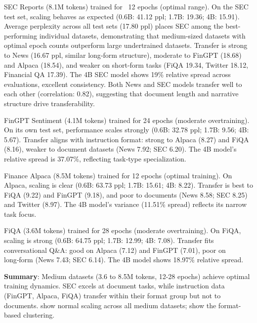 SEC Reports (8.1M tokens) trained for ~12 epochs (optimal range). On the SEC test set, scaling behaves as expected (0.6B: 41.12 ppl; 1.7B: 19.36; 4B: 15.91). Average perplexity across all test sets (17.80 ppl) places SEC among the best-performing individual datasets, demonstrating that medium-sized datasets with optimal epoch counts outperform large undertrained datasets. Transfer is strong to News (16.67 ppl, similar long‑form structure), moderate to FinGPT (18.68) and Alpaca (18.54), and weaker on short‑form tasks (FiQA 19.34, Twitter 18.12, Financial QA 17.39). The 4B SEC model shows 19\% relative spread across evaluations, excellent consistency. Both News and SEC models transfer well to each other (correlation: 0.82), suggesting that document length and narrative structure drive transferability.

FinGPT Sentiment (4.1M tokens) trained for 24 epochs (moderate overtraining). On its own test set, performance scales strongly (0.6B: 32.78 ppl; 1.7B: 9.56; 4B: 5.67). Transfer aligns with instruction format: strong to Alpaca (8.27) and FiQA (8.16), weaker to document datasets (News 7.92; SEC 6.20). The 4B model's relative spread is 37.07\%, reflecting task‑type specialization.

Finance Alpaca (8.5M tokens) trained for 12 epochs (optimal training). On Alpaca, scaling is clear (0.6B: 63.73 ppl; 1.7B: 15.61; 4B: 8.22). Transfer is best to FiQA (9.22) and FinGPT (9.18), and poor to documents (News 8.58; SEC 8.25) and Twitter (8.97). The 4B model's variance (11.51\% spread) reflects its narrow task focus.

FiQA (3.6M tokens) trained for 28 epochs (moderate overtraining). On FiQA, scaling is strong (0.6B: 64.75 ppl; 1.7B: 12.99; 4B: 7.08). Transfer fits conversational Q\&A: good on Alpaca (7.12) and FinGPT (7.01), poor on long‑form (News 7.43; SEC 6.14). The 4B model shows 18.97\% relative spread.

\textbf{Summary}: Medium datasets (3.6 to 8.5M tokens, 12-28 epochs) achieve optimal training dynamics. SEC excels at document tasks, while instruction data (FinGPT, Alpaca, FiQA) transfer within their format group but not to documents.  show normal scaling across all medium datasets;  show the format-based clustering.


